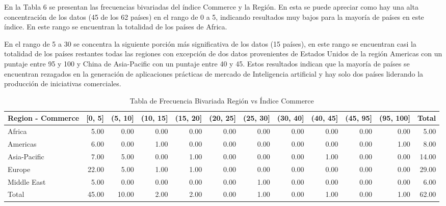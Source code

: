\documentclass[
]{article}
\begin{document}
\begin{multicols}{2}

En la Tabla 6 se presentan las frecuencias bivariadas del índice Commerce y la Región. En esta se puede apreciar como hay una alta concentración de los datos (45 de los 62 países) en el rango de 0 a 5, indicando resultados muy bajos para la mayoría de países en este índice. En este rango se encuentran la totalidad de los países de Africa.

En el rango de 5 a 30 se concentra la siguiente porción más significativa de los datos (15 países), en este rango se encuentran casi la totalidad de los países restantes todas las regiones con excepción de dos datos provenientes de Estados Unidos de la región Americas con un puntaje entre 95 y 100 y China de Asia-Pacific con un puntaje entre 40 y 45. Estos resultados indican que la mayoría de países se encuentran rezagados en la generación de aplicaciones prácticas de mercado de Inteligencia artificial y hay solo dos países liderando la producción de iniciativas comerciales.

\end{multicols}

\renewcommand{\arraystretch}{1.3}
\begin{scriptsize}%
\begin{longtable}{lrrrrrrrrrrr}
\caption{Tabla de Frecuencia Bivariada Región vs Índice Commerce} \\ 
  \hline
Region - Commerce & [0, 5] & (5, 10] & (10, 15] & (15, 20] & (20, 25] & (25, 30] & (30, 40] & (40, 45] & (45, 95] & (95, 100] & Total \\ 
  \hline
Africa & 5.00 & 0.00 & 0.00 & 0.00 & 0.00 & 0.00 & 0.00 & 0.00 & 0.00 & 0.00 & 5.00 \\ 
  Americas & 6.00 & 0.00 & 1.00 & 0.00 & 0.00 & 0.00 & 0.00 & 0.00 & 0.00 & 1.00 & 8.00 \\ 
  Asia-Pacific & 7.00 & 5.00 & 0.00 & 1.00 & 0.00 & 0.00 & 0.00 & 1.00 & 0.00 & 0.00 & 14.00 \\ 
  Europe & 22.00 & 5.00 & 1.00 & 1.00 & 0.00 & 0.00 & 0.00 & 0.00 & 0.00 & 0.00 & 29.00 \\ 
  Middle East & 5.00 & 0.00 & 0.00 & 0.00 & 0.00 & 1.00 & 0.00 & 0.00 & 0.00 & 0.00 & 6.00 \\ 
  Total & 45.00 & 10.00 & 2.00 & 2.00 & 0.00 & 1.00 & 0.00 & 1.00 & 0.00 & 1.00 & 62.00 \\ 
   \hline
\hline
\end{longtable}
\end{scriptsize}\renewcommand{\arraystretch}{1}
\end{document}
